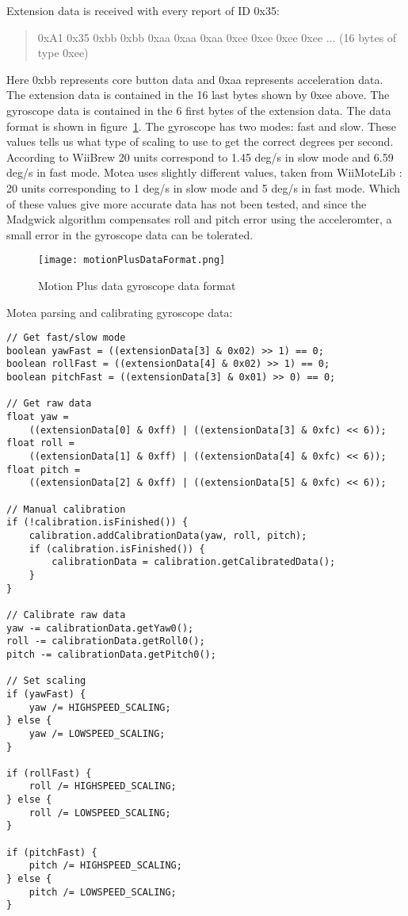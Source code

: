Extension data is received with every report of ID 0x35:
\begin{quote}
0xA1 0x35 0xbb 0xbb 0xaa 0xaa 0xaa 0xee 0xee 0xee 0xee ... (16 bytes of type 0xee)
\end{quote}
Here 0xbb represents core button data and 0xaa represents acceleration data. The extension data is contained in the 16 last bytes shown by 0xee above. The gyroscope data is contained in the 6 first bytes of the extension data. The data format is shown in figure~\ref{fig:motionPlusDataFormat}. The gyroscope has two modes: fast and slow. These values tells us what type of scaling to use to get the correct degrees per second. According to WiiBrew \cite{wiiBrew} 20 units correspond to 1.45 deg/s in slow mode and 6.59 deg/s in fast mode. Motea uses slightly different values, taken from WiiMoteLib \cite{wiiMoteLib}: 20 units corresponding to 1 deg/s in slow mode and 5 deg/s in fast mode. Which of these values give more accurate data has not been tested, and since the Madgwick algorithm \cite{madgwick} compensates roll and pitch error using the acceleromter, a small error in the gyroscope data can be tolerated. 
\begin{figure}[h!]
  \centering
    \texttt{[image: motionPlusDataFormat.png]}
    \caption{\footnotesize Motion Plus data gyroscope data format}
    \label{fig:motionPlusDataFormat}
\end{figure}

Motea parsing and calibrating gyroscope data:
\begin{lstlisting}
// Get fast/slow mode
boolean yawFast = ((extensionData[3] & 0x02) >> 1) == 0;
boolean rollFast = ((extensionData[4] & 0x02) >> 1) == 0;
boolean pitchFast = ((extensionData[3] & 0x01) >> 0) == 0;

// Get raw data
float yaw = 
	((extensionData[0] & 0xff) | ((extensionData[3] & 0xfc) << 6));
float roll = 
	((extensionData[1] & 0xff) | ((extensionData[4] & 0xfc) << 6));
float pitch = 
	((extensionData[2] & 0xff) | ((extensionData[5] & 0xfc) << 6));

// Manual calibration
if (!calibration.isFinished()) {
	calibration.addCalibrationData(yaw, roll, pitch);
	if (calibration.isFinished()) {
		calibrationData = calibration.getCalibratedData();
	}
}

// Calibrate raw data
yaw -= calibrationData.getYaw0();
roll -= calibrationData.getRoll0();
pitch -= calibrationData.getPitch0();

// Set scaling
if (yawFast) {
	yaw /= HIGHSPEED_SCALING;
} else {
	yaw /= LOWSPEED_SCALING;
}

if (rollFast) {
	roll /= HIGHSPEED_SCALING;
} else {
	roll /= LOWSPEED_SCALING;
}

if (pitchFast) {
	pitch /= HIGHSPEED_SCALING;
} else {
	pitch /= LOWSPEED_SCALING;
}
\end{lstlisting}

